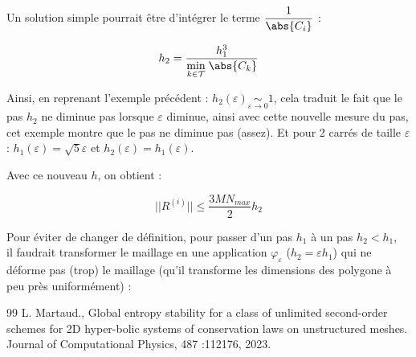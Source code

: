 \documentclass[12pt,a4paper]{article}
\begin{document}
	Un solution simple pourrait être d'intégrer le terme $\dfrac1{\abs{C_i}}$ :
	
	\begin{equation}\label{eq:nv_h}
		h_2 = \dfrac{h_1^3}{\underset{k\in \mathcal T}\min\;\abs{C_k}}
	\end{equation}
	
	Ainsi, en reprenant l'exemple précédent : $h_2(\varepsilon) \underset{\varepsilon\to0}\sim 1$, cela traduit le fait que le pas $h_2$ ne diminue pas lorsque $\varepsilon$ diminue, ainsi avec cette nouvelle mesure du pas, cet exemple montre que le pas ne diminue pas (assez). Et pour 2 carrés de taille $\varepsilon$ : $h_1(\varepsilon) = \sqrt{5}\varepsilon$ et $h_2(\varepsilon) = h_1(\varepsilon)$.
	
	
	Avec ce nouveau $h$, on obtient :
	
	\begin{equation}\label{eq:max_naiv_R4}
		|\!| {R^{(i)}}|\!| \leq \frac{3MN_{max}}2h_2
	\end{equation}
	
	\vspace{1cm}
	
	\begin{rmq}
		\begin{minipage}[t]{15cm}
			Pour éviter de changer de définition, pour passer d'un pas $h_1$ à un pas $h_2<h_1$,\\ 
			il faudrait transformer le maillage en une application $\varphi_\varepsilon$ ($h_2 = \varepsilon h_1$) qui ne déforme pas (trop) le maillage (qu'il transforme les dimensions des polygone à peu près uniformément) : 
			
			\vspace{.2cm}
			
			\noindent{}
		\end{minipage}
	\end{rmq}
	
	\newpage
	
	\begin{thebibliography}{99}	
		L. Martaud.,
		Global entropy stability for a class of unlimited second-order schemes for 2D hyper-bolic systems of conservation laws on unstructured meshes.
		Journal of Computational Physics,
		487 :112176, 2023.
		
	\end{thebibliography}
\end{document}

